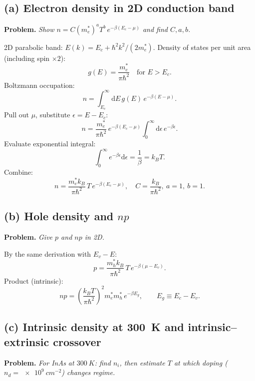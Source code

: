 \documentclass[11pt]{article}
\newcommand{\de}{\mathrm{d}}
\begin{document}
\subsection*{(a) Electron density in 2D conduction band}

\textbf{Problem.} \emph{Show $n = C(m_e^*)^a T^b\, e^{-\beta(E_c-\mu)}$ and find $C,a,b$.}

2D parabolic band: $E(k) = E_c + \hbar^2 k^2/(2m_e^*)$. Density of states per unit area (including spin $\times 2$):
\[
g(E) = \frac{m_e^*}{\pi\hbar^2}\quad\text{for } E>E_c.
\]
Boltzmann occupation:
\[
n = \int_{E_c}^{\infty}\!\de E\, g(E)\, e^{-\beta(E-\mu)}.
\]
Pull out $\mu$, substitute $\epsilon=E-E_c$:
\[
n = \frac{m_e^*}{\pi\hbar^2}\, e^{-\beta(E_c-\mu)}\int_0^{\infty}\!\de\epsilon\, e^{-\beta\epsilon}.
\]
Evaluate exponential integral:
\[
\int_0^\infty e^{-\beta\epsilon}\de\epsilon = \frac{1}{\beta} = k_B T.
\]
Combine:
\[
\boxed{\;n = \frac{m_e^* k_B}{\pi\hbar^2}\,T\, e^{-\beta(E_c-\mu)}, \quad C=\frac{k_B}{\pi\hbar^2},\ a=1,\ b=1.\;}
\]

\subsection*{(b) Hole density and $np$}

\textbf{Problem.} \emph{Give $p$ and $np$ in 2D.}

By the same derivation with $E_v - E$:
\[
\boxed{\;p = \frac{m_h^* k_B}{\pi\hbar^2}\, T\, e^{-\beta(\mu-E_v)}.\;}
\]
Product (intrinsic):
\[
\boxed{\;np = \left(\frac{k_B T}{\pi\hbar^2}\right)^{\!2}\! m_e^* m_h^*\, e^{-\beta E_g}, \qquad E_g\equiv E_c-E_v.\;}
\]

\subsection*{(c) Intrinsic density at \SI{300}{K} and intrinsic--extrinsic crossover}

\textbf{Problem.} \emph{For InAs at $\SI{300}{K}$: find $n_i$, then estimate $T$ at which doping ($n_d=\SI{e9}{cm^{-2}}$) changes regime.}
\end{document}
